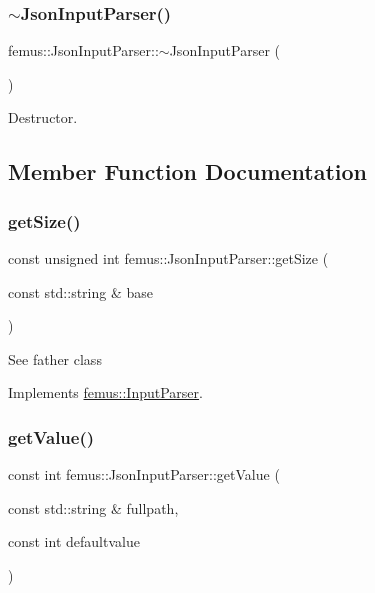 \subsubsection{\texorpdfstring{$\sim$\+Json\+Input\+Parser()}{~JsonInputParser()}}
{\footnotesize\ttfamily femus\+::\+Json\+Input\+Parser\+::$\sim$\+Json\+Input\+Parser (\begin{DoxyParamCaption}{ }\end{DoxyParamCaption})}

Destructor. 

\subsection{Member Function Documentation}
\mbox{\label{classfemus_1_1_json_input_parser_a535b2e19baf4fff32dc5fa54816b0496}} 
\subsubsection{\texorpdfstring{get\+Size()}{getSize()}}
{\footnotesize\ttfamily const unsigned int femus\+::\+Json\+Input\+Parser\+::get\+Size (\begin{DoxyParamCaption}\item[{const std\+::string \&}]{base }\end{DoxyParamCaption})\hspace{0.3cm}{\ttfamily [virtual]}}

See father class 

Implements \mbox{\hyperlink{classfemus_1_1_input_parser_a7249522721ec07de009ffd04286847c5}{femus\+::\+Input\+Parser}}.

\mbox{\label{classfemus_1_1_json_input_parser_a7446c6ec4674101f6e0ad48778122076}} 
\subsubsection{\texorpdfstring{get\+Value()}{getValue()}\hspace{0.1cm}{\footnotesize\ttfamily [1/6]}}
{\footnotesize\ttfamily const int femus\+::\+Json\+Input\+Parser\+::get\+Value (\begin{DoxyParamCaption}\item[{const std\+::string \&}]{fullpath,  }\item[{const int}]{defaultvalue }\end{DoxyParamCaption})\hspace{0.3cm}{\ttfamily [virtual]}}

